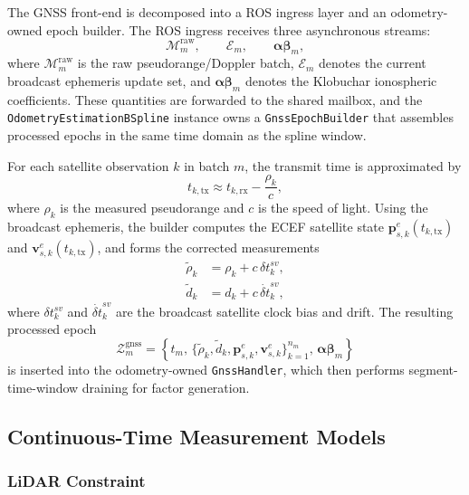 \documentclass[journal]{IEEEtran}
\begin{document}
The GNSS front-end is decomposed into a ROS ingress layer and an odometry-owned
epoch builder. The ROS ingress receives three asynchronous streams:
\begin{equation}
\mathcal{M}^{\text{raw}}_m,\qquad
\mathcal{E}_m,\qquad
\bm{\alpha\beta}_m,
\label{eq:gnss_streams}
\end{equation}
where $\mathcal{M}^{\text{raw}}_m$ is the raw pseudorange/Doppler batch,
$\mathcal{E}_m$ denotes the current broadcast ephemeris update set, and
$\bm{\alpha\beta}_m$ denotes the Klobuchar ionospheric coefficients.
These quantities are forwarded to the shared mailbox, and the
\texttt{OdometryEstimationBSpline} instance owns a \texttt{GnssEpochBuilder}
that assembles processed epochs in the same time domain as the spline window.

For each satellite observation $k$ in batch $m$, the transmit time is
approximated by
\begin{equation}
t_{k,\mathrm{tx}} \approx t_{k,\mathrm{rx}} - \frac{\rho_k}{c},
\label{eq:tx_time}
\end{equation}
where $\rho_k$ is the measured pseudorange and $c$ is the speed of light.
Using the broadcast ephemeris, the builder computes the ECEF satellite state
$\mathbf{p}^{e}_{s,k}(t_{k,\mathrm{tx}})$ and
$\mathbf{v}^{e}_{s,k}(t_{k,\mathrm{tx}})$, and forms the corrected
measurements
\begin{align}
\tilde{\rho}_k &= \rho_k + c\,\delta t^{sv}_k, \label{eq:rho_corrected}\\
\tilde{d}_k &= d_k + c\,\dot{\delta t}^{sv}_k,
\label{eq:doppler_corrected}
\end{align}
where $\delta t^{sv}_k$ and $\dot{\delta t}^{sv}_k$ are the broadcast satellite
clock bias and drift. The resulting processed epoch
\begin{equation}
\mathcal{Z}^{\text{gnss}}_m =
\left\{
t_m,\,
\{\tilde{\rho}_k,\tilde{d}_k,\mathbf{p}^{e}_{s,k},\mathbf{v}^{e}_{s,k}\}_{k=1}^{n_m},\,
\bm{\alpha\beta}_m
\right\}
\label{eq:processed_epoch}
\end{equation}
is inserted into the odometry-owned \texttt{GnssHandler}, which then performs
segment-time-window draining for factor generation.

\subsection{Continuous-Time Measurement Models}
\label{sec:measurement_models}

\subsubsection{LiDAR Constraint}
\end{document}
